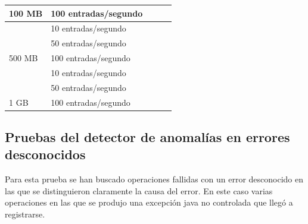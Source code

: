 \begin{table}[H]
\begin{tabular}{|l|l|l|l|l|}
\multirow{-3}{*}{100 MB}                                 & 100 entradas/segundo                              &                                        &                                        &                                                 \\ \hline
                                                         & 10 entradas/segundo                               &                                        &                                        &                                                 \\ \cline{2-5} 
                                                         & 50 entradas/segundo                               &                                        &                                        &                                                 \\ \cline{2-5} 
\multirow{-3}{*}{500 MB}                                 & 100 entradas/segundo                              &                                        &                                        &                                                 \\ \hline
                                                         & 10 entradas/segundo                               &                                        &                                        &                                                 \\ \cline{2-5} 
                                                         & 50 entradas/segundo                               &                                        &                                        &                                                 \\ \cline{2-5} 
\multirow{-3}{*}{1 GB}                                   & 100 entradas/segundo                              &                                        &                                        &                                                 \\ \hline
\end{tabular}
\end{table}


\subsection{Pruebas del detector de anomalías en errores desconocidos}

Para esta prueba se han buscado operaciones fallidas con un error desconocido en las que se distinguieron claramente la causa del error. En este caso varias operaciones en las que se produjo una excepción java no controlada que llegó a registrarse.

